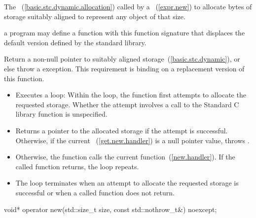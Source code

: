 \begin{itemdescr}
\pnum
\effects
The
~(\ref{basic.stc.dynamic.allocation})
called by a
~(\ref{expr.new})
to allocate
 bytes of storage suitably aligned to represent any object
of that size.

\pnum
\replaceable
a \Cpp program may define a function with this function signature
that displaces the default version defined by the
\Cpp standard library.

\pnum
\required 
Return a non-null pointer to suitably aligned storage~(\ref{basic.stc.dynamic}),
or else throw a
%
exception.
This requirement is binding on a replacement version of this function.

\pnum
{}

\begin{itemize}
\item
Executes a loop:
Within the loop, the function first attempts to allocate the requested storage.
Whether the attempt involves a call to the Standard C library function
is unspecified.
%
\item
Returns a pointer to the allocated storage if the attempt is successful.
Otherwise, if the
current ~(\ref{get.new.handler}) is
a null pointer value, throws
.
\item
Otherwise, the function calls the current
 function~(\ref{new.handler}).
If the called function returns, the loop repeats.
\item
The loop terminates when an attempt to allocate the requested storage is
successful or when a called
function does not return.
\end{itemize}
\end{itemdescr}

%
\begin{itemdecl}
void* operator new(std::size_t size, const std::nothrow_t&) noexcept;
\end{itemdecl}

